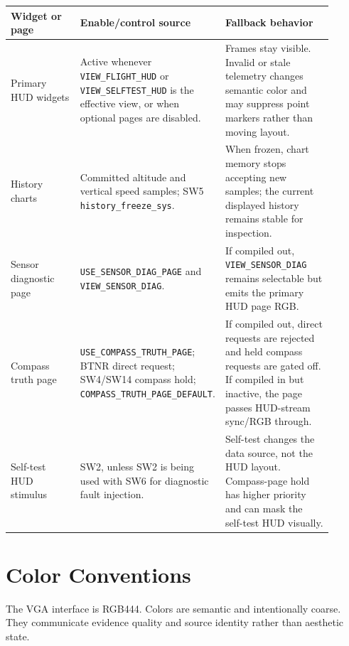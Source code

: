 \documentclass{article}
\newcommand{\sig}[1]{\begingroup\nolinkurl{#1}\endgroup}
\newcommand{\param}[1]{\begingroup\nolinkurl{#1}\endgroup}
\begin{document}
\begin{longtable}{p{0.25\linewidth} p{0.28\linewidth} p{0.37\linewidth}}
\toprule
\textbf{Widget or page} & \textbf{Enable/control source} & \textbf{Fallback behavior} \\
\midrule
\endhead
Primary HUD widgets &
Active whenever \sig{VIEW_FLIGHT_HUD} or \sig{VIEW_SELFTEST_HUD} is the
effective view, or when optional pages are disabled. &
Frames stay visible.  Invalid or stale telemetry changes semantic color and
may suppress point markers rather than moving layout. \\

History charts &
Committed altitude and vertical speed samples; SW5
\sig{history_freeze_sys}. &
When frozen, chart memory stops accepting new samples; the current displayed
history remains stable for inspection. \\

Sensor diagnostic page &
\param{USE_SENSOR_DIAG_PAGE} and \sig{VIEW_SENSOR_DIAG}. &
If compiled out, \sig{VIEW_SENSOR_DIAG} remains selectable but emits the
primary HUD page RGB. \\

Compass truth page &
\param{USE_COMPASS_TRUTH_PAGE}; BTNR direct request; SW4/SW14 compass hold;
\sig{COMPASS_TRUTH_PAGE_DEFAULT}. &
If compiled out, direct requests are rejected and held compass requests are
gated off.  If compiled in but inactive, the page passes HUD-stream sync/RGB
through. \\

Self-test HUD stimulus &
SW2, unless SW2 is being used with SW6 for diagnostic fault injection. &
Self-test changes the data source, not the HUD layout.  Compass-page hold has
higher priority and can mask the self-test HUD visually. \\
\bottomrule
\end{longtable}

\section{Color Conventions}

The VGA interface is RGB444.  Colors are semantic and intentionally coarse.
They communicate evidence quality and source identity rather than aesthetic
state.
\end{document}
